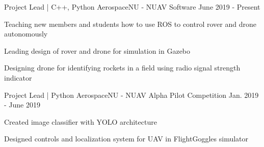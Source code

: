 
\begin{cventries}
  \cventry
    {Project Lead | C++, Python} %
    {AerospaceNU - NUAV Software} %
    {} %
    {June 2019 - Present} %
    {
      \begin{cvitems} %
        \item {Teaching new members and students how to use ROS to control rover and drone autonomously}
        \item {Leading design of rover and drone for simulation in Gazebo}
        \item {Designing drone for identifying rockets in a field using radio signal strength indicator}
      \end{cvitems}
    }
  \cventry
    {Project Lead | Python} %
    {AerospaceNU - NUAV Alpha Pilot Competition} %
    {} %
    {Jan. 2019 - June 2019} %
    {
      \begin{cvitems} %
        \item {Created image classifier with YOLO architecture}
        \item {Designed controls and localization system for UAV in FlightGoggles simulator}
      \end{cvitems}
    }
\end{cventries}
